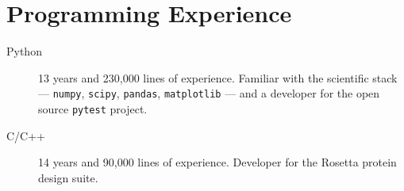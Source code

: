 \section{Programming Experience\protect\footnotemark}

\begin{description}

\item[Python] 
        13 years and 230,000 lines of experience.  Familiar with the scientific 
        stack --- \texttt{numpy}, \texttt{scipy}, \texttt{pandas}, 
        \texttt{matplotlib} --- and a developer for the open source 
        \texttt{pytest} project.

\item[C/C++]
        14 years and 90,000 lines of experience.  Developer for the Rosetta 
        protein design suite.

\end{description}


